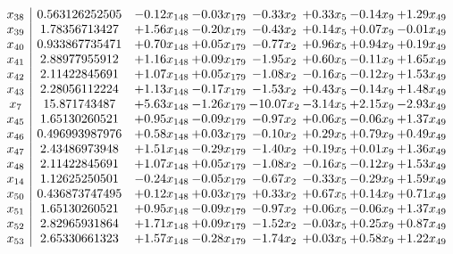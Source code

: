 \documentclass[8pt]{article}
\begin{document}
\[\begin{array}{c| c c@{\hskip 2pt} c@{\hskip 2pt} c@{\hskip 2pt} c@{\hskip 2pt} c@{\hskip 2pt} c@{\hskip 2pt} }
 x_{38}   &  0.563126252505 & -0.12 x_{148} & -0.03 x_{179} & -0.33 x_{2} & +  0.33 x_{5} & -0.14 x_{9} & +  1.29 x_{49}\\
 x_{39}   &  1.78356713427 & +  1.56 x_{148} & -0.20 x_{179} & -0.43 x_{2} & +  0.14 x_{5} & +  0.07 x_{9} & -0.01 x_{49}\\
 x_{40}   &  0.933867735471 & +  0.70 x_{148} & +  0.05 x_{179} & -0.77 x_{2} & +  0.96 x_{5} & +  0.94 x_{9} & +  0.19 x_{49}\\
 x_{41}   &  2.88977955912 & +  1.16 x_{148} & +  0.09 x_{179} & -1.95 x_{2} & +  0.60 x_{5} & -0.11 x_{9} & +  1.65 x_{49}\\
 x_{42}   &  2.11422845691 & +  1.07 x_{148} & +  0.05 x_{179} & -1.08 x_{2} & -0.16 x_{5} & -0.12 x_{9} & +  1.53 x_{49}\\
 x_{43}   &  2.28056112224 & +  1.13 x_{148} & -0.17 x_{179} & -1.53 x_{2} & +  0.43 x_{5} & -0.14 x_{9} & +  1.48 x_{49}\\
 x_{7}   &  15.871743487 & +  5.63 x_{148} & -1.26 x_{179} & -10.07 x_{2} & -3.14 x_{5} & +  2.15 x_{9} & -2.93 x_{49}\\
 x_{45}   &  1.65130260521 & +  0.95 x_{148} & -0.09 x_{179} & -0.97 x_{2} & +  0.06 x_{5} & -0.06 x_{9} & +  1.37 x_{49}\\
 x_{46}   &  0.496993987976 & +  0.58 x_{148} & +  0.03 x_{179} & -0.10 x_{2} & +  0.29 x_{5} & +  0.79 x_{9} & +  0.49 x_{49}\\
 x_{47}   &  2.43486973948 & +  1.51 x_{148} & -0.29 x_{179} & -1.40 x_{2} & +  0.19 x_{5} & +  0.01 x_{9} & +  1.36 x_{49}\\
 x_{48}   &  2.11422845691 & +  1.07 x_{148} & +  0.05 x_{179} & -1.08 x_{2} & -0.16 x_{5} & -0.12 x_{9} & +  1.53 x_{49}\\
 x_{14}   &  1.12625250501 & -0.24 x_{148} & -0.05 x_{179} & -0.67 x_{2} & -0.33 x_{5} & -0.29 x_{9} & +  1.59 x_{49}\\
 x_{50}   &  0.436873747495 & +  0.12 x_{148} & +  0.03 x_{179} & +  0.33 x_{2} & +  0.67 x_{5} & +  0.14 x_{9} & +  0.71 x_{49}\\
 x_{51}   &  1.65130260521 & +  0.95 x_{148} & -0.09 x_{179} & -0.97 x_{2} & +  0.06 x_{5} & -0.06 x_{9} & +  1.37 x_{49}\\
 x_{52}   &  2.82965931864 & +  1.71 x_{148} & +  0.09 x_{179} & -1.52 x_{2} & -0.03 x_{5} & +  0.25 x_{9} & +  0.87 x_{49}\\
 x_{53}   &  2.65330661323 & +  1.57 x_{148} & -0.28 x_{179} & -1.74 x_{2} & +  0.03 x_{5} & +  0.58 x_{9} & +  1.22 x_{49}\\

\end{array}\]
\end{document}
